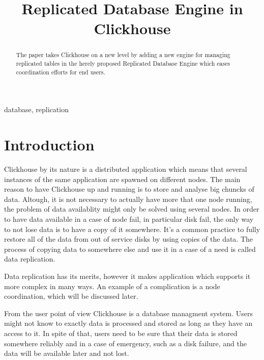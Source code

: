\documentclass[conference]{IEEEtran}
\begin{document}
\title{Replicated Database Engine in Clickhouse
}

\author{
}

\maketitle

\begin{abstract}
The paper takes Clickhouse on a
new level by adding a new engine for managing replicated tables in the herely
proposed Replicated Database Engine which eases coordination efforts for end users.
\end{abstract}

\begin{IEEEkeywords}
database, replication
\end{IEEEkeywords}

\section{Introduction}

Clickhouse\cite{clickhousedocs} by its nature is a distributed application which means
that several instances of the same application are spawned
on different nodes. The main reason to have Clickhouse up and running is to
store and analyse big chuncks of data. Altough, it is not necessary to actually
have more that one node running, the problem of data availablity might only be solved
using several nodes. In order to have data available in a case of node fail,
in particular disk fail, the only way to not lose data is to have a copy of it
somewhere. It's a common practice to fully restore all of the data %
from out of service disks by using copies of the data. The process of copying
data to somewhere else and use it in a case of a need is called data replication.

Data replication has its merits, however it makes application which supports it more
complex in many ways.
An example of a complication is a node coordination, which will be discussed later. %

From the user point of view Clickhouse is a database managment system.
Users might not know to exactly data is processed and stored as long as they have %
an access to it.
In spite of that, users need to be sure that their data is stored somewhere
reliably and in a case of emergency, such as a disk failure, and the data will be %
available later and not lost.
\end{document}
